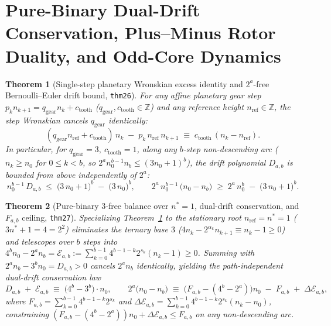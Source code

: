 \documentclass[11pt,a4paper]{article}
\newtheorem{theorem}{Theorem}[section]
\theoremstyle{definition}
\theoremstyle{remark}
\begin{document}
\section{Pure-Binary Dual-Drift Conservation, Plus--Minus Rotor Duality, and Odd-Core Dynamics}
\label{sec:dual-drift-and-odd-cores}

\begin{theorem}[Single-step planetary Wronskian excess identity and $2^a$-free Bernoulli--Euler drift bound, \texttt{thm26}]
\label{thm:bernoulli-euler-drift-bound}
For any affine planetary gear step $p_k n_{k+1} = q_{\mathrm{gear}} n_k + c_{\mathrm{tooth}}$ ($q_{\mathrm{gear}},c_{\mathrm{tooth}}\in\mathbb{Z}$) and any reference height $n_{\mathrm{ref}} \in \mathbb{Z}$, the step Wronskian cancels $q_{\mathrm{gear}}$ identically:
\[
  (q_{\mathrm{gear}} n_{\mathrm{ref}} + c_{\mathrm{tooth}})\, n_k \;-\; p_k\, n_{\mathrm{ref}}\, n_{k+1} \;\equiv\; c_{\mathrm{tooth}}\,(n_k - n_{\mathrm{ref}}).
\]
In particular, for $q_{\mathrm{gear}}=3,\ c_{\mathrm{tooth}}=1$, along any $b$-step non-descending arc ($n_k \ge n_0$ for $0 \le k < b$, so $2^a n_0^{b-1} n_b \le (3 n_0 + 1)^b$), the drift polynomial $D_{a,b}$ is bounded from above independently of $2^a$:
\begin{equation}
  \label{eq:bernoulli-euler-drift-bound}
  n_0^{b-1}\,D_{a,b} \;\le\; \bigl(3\,n_0 + 1\bigr)^b \;-\; \bigl(3\,n_0\bigr)^b, \qquad
  2^a\,n_0^{b-1}\,\bigl(n_0 - n_b\bigr) \;\ge\; 2^a\,n_0^b \;-\; \bigl(3\,n_0 + 1\bigr)^b.
\end{equation}
\end{theorem}

\begin{theorem}[Pure-binary $3$-free balance over $n^* = 1$, dual-drift conservation, and $F_{a,b}$ ceiling, \texttt{thm27}]
\label{thm:pure-binary-dual-drift}
Specializing Theorem~\ref{thm:bernoulli-euler-drift-bound} to the stationary root $n_{\mathrm{ref}} = n^* = 1$ ($3 n^* + 1 = 4 = 2^2$) eliminates the ternary base $3$ ($4 n_k - 2^{\alpha_k} n_{k+1} \equiv n_k - 1 \ge 0$) and telescopes over $b$ steps into $4^b n_0 - 2^a n_b = \mathcal{E}_{a,b} := \sum_{k=0}^{b-1} 4^{b-1-k} 2^{s_k}(n_k - 1) \ge 0$. Summing with $2^a n_b - 3^b n_0 = D_{a,b} > 0$ cancels $2^a n_b$ identically, yielding the path-independent dual-drift conservation law
\begin{equation}
  \label{eq:dual-drift-conservation}
  D_{a,b} \;+\; \mathcal{E}_{a,b} \;\equiv\; \bigl(4^b - 3^b\bigr)\cdot n_0, \qquad
  2^a\bigl(n_0 - n_b\bigr) \;\equiv\; \bigl(F_{a,b} - (4^b - 2^a)\bigr) n_0 \;-\; F_{a,b} \;+\; \Delta\mathcal{E}_{a,b},
\end{equation}
where $F_{a,b} = \sum_{k=0}^{b-1} 4^{b-1-k} 2^{s_k}$ and $\Delta\mathcal{E}_{a,b} = \sum_{k=0}^{b-1} 4^{b-1-k} 2^{s_k}(n_k - n_0)$, constraining $(F_{a,b} - (4^b - 2^a)) n_0 + \Delta\mathcal{E}_{a,b} \le F_{a,b}$ on any non-descending arc.
\end{theorem}
\end{document}
